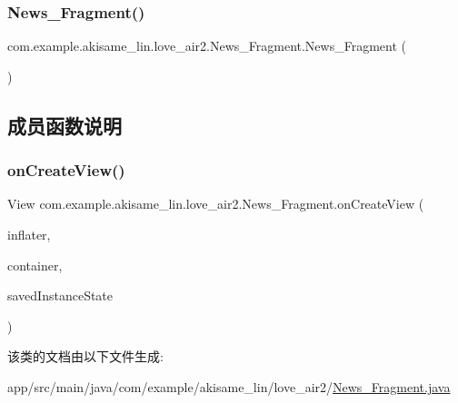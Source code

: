\subsubsection{\texorpdfstring{News\_Fragment()}{News\_Fragment()}}
{\footnotesize\ttfamily com.\+example.\+akisame\+\_\+lin.\+love\+\_\+air2.\+News\+\_\+\+Fragment.\+News\+\_\+\+Fragment (\begin{DoxyParamCaption}{ }\end{DoxyParamCaption})\hspace{0.3cm}{\ttfamily [inline]}}



\subsection{成员函数说明}
\mbox{\label{classcom_1_1example_1_1akisame__lin_1_1love__air2_1_1_news___fragment_aaac54952ce880bd19f413033e0b5255d}} 
\subsubsection{\texorpdfstring{onCreateView()}{onCreateView()}}
{\footnotesize\ttfamily View com.\+example.\+akisame\+\_\+lin.\+love\+\_\+air2.\+News\+\_\+\+Fragment.\+on\+Create\+View (\begin{DoxyParamCaption}\item[{Layout\+Inflater}]{inflater,  }\item[{View\+Group}]{container,  }\item[{Bundle}]{saved\+Instance\+State }\end{DoxyParamCaption})\hspace{0.3cm}{\ttfamily [inline]}}



该类的文档由以下文件生成\+:\begin{DoxyCompactItemize}
\item 
app/src/main/java/com/example/akisame\+\_\+lin/love\+\_\+air2/\mbox{\hyperlink{_news___fragment_8java}{News\+\_\+\+Fragment.\+java}}\end{DoxyCompactItemize}
